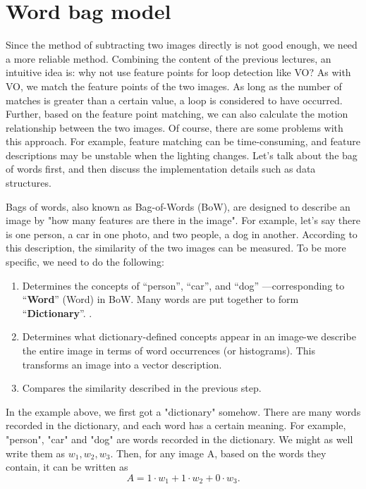 \section{Word bag model}
Since the method of subtracting two images directly is not good enough, we need a more reliable method. Combining the content of the previous lectures, an intuitive idea is: why not use feature points for loop detection like VO? As with VO, we match the feature points of the two images. As long as the number of matches is greater than a certain value, a loop is considered to have occurred. Further, based on the feature point matching, we can also calculate the motion relationship between the two images. Of course, there are some problems with this approach. For example, feature matching can be time-consuming, and feature descriptions may be unstable when the lighting changes. Let's talk about the bag of words first, and then discuss the implementation details such as data structures.

Bags of words, also known as Bag-of-Words (BoW), are designed to describe an image by "how many features are there in the image". For example, let's say there is one person, a car in one photo, and two people, a dog in another. According to this description, the similarity of the two images can be measured. To be more specific, we need to do the following:

\begin{enumerate}
\item Determines the concepts of “person”, “car”, and “dog” —corresponding to “\textbf{Word}” (Word) in BoW. Many words are put together to form “\textbf{Dictionary}”. .
\item Determines what dictionary-defined concepts appear in an image-we describe the entire image in terms of word occurrences (or histograms). This transforms an image into a vector description.
\item Compares the similarity described in the previous step.
\end{enumerate}

In the example above, we first got a "dictionary" somehow. There are many words recorded in the dictionary, and each word has a certain meaning. For example, "person", "car" and "dog" are words recorded in the dictionary. We might as well write them as $w_1, w_2, w_3 $. Then, for any image A, based on the words they contain, it can be written as
\begin{equation}
A = 1 \cdot w_1+1\cdot w_2 + 0 \cdot w_3.
\end{equation}

